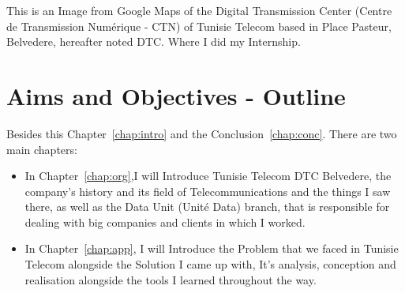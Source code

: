 	This is an Image from Google Maps of the Digital Transmission Center (Centre de Transmission Numérique - CTN) of Tunisie Telecom based in Place Pasteur, Belvedere, hereafter noted DTC. Where I did my Internship.


\section{Aims and Objectives - Outline} 

	Besides this Chapter~\autoref{chap:intro} and the Conclusion~\autoref{chap:conc}. There are two main chapters:
	\begin{itemize}
	\item In Chapter~\autoref{chap:org},I will Introduce Tunisie Telecom DTC Belvedere, the company's history and its field of Telecommunications and the things I saw there, as well as the Data Unit (Unité Data) branch, that is responsible for dealing with big companies and clients in which I worked.
	\item In Chapter~\autoref{chap:app}, I will Introduce the Problem that we faced in Tunisie Telecom alongside the Solution I came up with, It's analysis, conception and realisation alongside the tools I learned throughout the way.

	\end{itemize}


